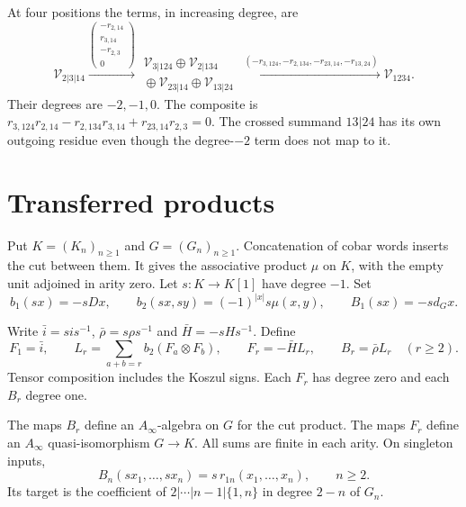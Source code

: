 At four positions the terms,
in increasing degree, are
\begin{equation}\label{cbc:ct:four}
 \mathcal V_{2|3|14}
 \xrightarrow{\left(\begin{smallmatrix}
 -r_{2,14}\\r_{3,14}\\-r_{2,3}\\0
 \end{smallmatrix}\right)}
 \begin{matrix}
 \mathcal V_{3|124}\oplus\mathcal V_{2|134}\\
 {}\oplus\mathcal V_{23|14}\oplus\mathcal V_{13|24}
 \end{matrix}
 \xrightarrow{\ (-r_{3,124},-r_{2,134},-r_{23,14},-r_{13,24})\ }
 \mathcal V_{1234}.
\end{equation}
Their degrees are $-2,-1,0$. The composite is
$r_{3,124}r_{2,14}-r_{2,134}r_{3,14}+r_{23,14}r_{2,3}=0$.
The crossed summand $13|24$ has its own outgoing residue even
though the degree-$-2$ term does not map to it.

\section{Transferred products}
\label{cbc:ct:products}

Put $K=(K_n)_{n\geq1}$ and $G=(G_n)_{n\geq1}$.
Concatenation of cobar words inserts the cut between them. It
gives the associative product $\mu$ on $K$, with the empty unit
adjoined in arity zero. Let $s:K\to K[1]$ have degree $-1$.
Set
\[
 b_1(sx)=-sDx,\qquad b_2(sx,sy)=(-1)^{|x|}s\mu(x,y),
 \qquad B_1(sx)=-sd_Gx.
\]

Write $\bar i=sis^{-1}$, $\bar\rho=s\rho s^{-1}$ and
$\bar H=-sHs^{-1}$. Define
\begin{equation}\label{cbc:ct:trees}
 F_1=\bar i,\qquad
 L_r=\sum_{a+b=r}b_2(F_a\otimes F_b),\qquad
 F_r=-\bar H L_r,\qquad B_r=\bar\rho L_r\quad(r\geq2).
\end{equation}
Tensor composition includes the Koszul signs. Each $F_r$ has
degree zero and each $B_r$ degree one.

\begin{theorem}\label{cbc:ct:transfer-products}
The maps $B_r$ define an $A_\infty$-algebra on $G$ for the
cut product. The maps $F_r$ define an $A_\infty$
quasi-isomorphism $G\to K$. All sums are finite in each arity.
On singleton inputs,
\begin{equation}\label{cbc:ct:outer}
 B_n(sx_1,\ldots,sx_n)=s\,r_{1n}(x_1,\ldots,x_n),
                \qquad n\geq2.
\end{equation}
Its target is the coefficient of
$2|\cdots|n-1|\{1,n\}$ in degree $2-n$ of $G_n$.
\end{theorem}

